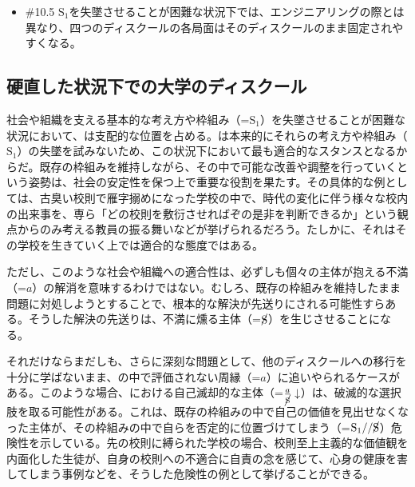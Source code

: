 \begin{note}{}
  \begin{itemize}
    \tightlist
    \item{\#10.5} $\textrm{S}_1$を失墜させることが困難な状況下では、エンジニアリングの際とは異なり、四つのディスクールの各局面はそのディスクールのまま固定されやすくなる。
  \end{itemize}
\end{note}

\subsection{硬直した状況下での大学のディスクール}\label{ux786cux76f4ux3057ux305fux72b6ux6cc1ux4e0bux3067ux306eux5927ux5b66ux306eux30c7ux30a3ux30b9ux30afux30fcux30eb}

社会や組織を支える基本的な考え方や枠組み（=\(\textrm{S}_1\)）を失墜させることが困難な状況において、は支配的な位置を占める。は本来的にそれらの考え方や枠組み（\(\textrm{S}_1\)）の失墜を試みないため、この状況下において最も適合的なスタンスとなるからだ。既存の枠組みを維持しながら、その中で可能な改善や調整を行っていくという姿勢は、社会の安定性を保つ上で重要な役割を果たす。その具体的な例としては、古臭い校則で雁字搦めになった学校の中で、時代の変化に伴う様々な校内の出来事を、専ら「どの校則を敷衍させればぞの是非を判断できるか」という観点からのみ考える教員の振る舞いなどが挙げられるだろう。たしかに、それはその学校を生きていく上では適合的な態度ではある。

ただし、このような社会や組織への適合性は、必ずしも個々の主体が抱える不満（=\(a\)）の解消を意味するわけではない。むしろ、既存の枠組みを維持したまま問題に対処しようとすることで、根本的な解決が先送りにされる可能性すらある。そうした解決の先送りは、不満に燻る主体（=\(\cancel{\textrm{S}}\)）を生じさせることになる。

それだけならまだしも、さらに深刻な問題として、他のディスクールへの移行を十分に学ばないまま、の中で評価されない周縁（=\(a\)）に追いやられるケースがある。このような場合、における自己滅却的な主体（=\(\frac{a}{\cancel{\textrm{S}}}\downarrow\)）は、破滅的な選択肢を取る可能性がある。これは、既存の枠組みの中で自己の価値を見出せなくなった主体が、その枠組みの中で自らを否定的に位置づけてしまう（=\(\textrm{S}_1//\cancel{\textrm{S}}\)）危険性を示している。先の校則に縛られた学校の場合、校則至上主義的な価値観を内面化した生徒が、自身の校則への不適合に自責の念を感じて、心身の健康を害してしまう事例などを、そうした危険性の例として挙げることができる。

